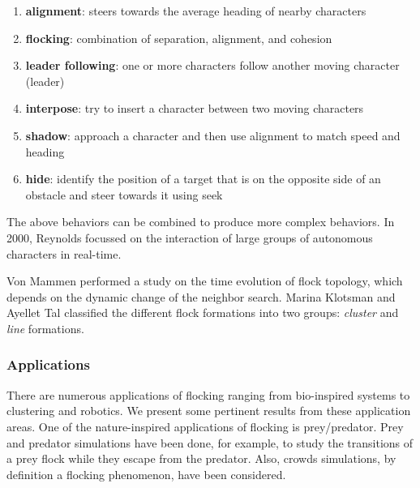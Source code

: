 \begin{enumerate}
\item \textbf{alignment}: steers towards the average heading of nearby characters
\item \textbf{flocking}: combination of separation, alignment, and cohesion
\item \textbf{leader following}: one or more characters follow another moving character (leader)
\item \textbf{interpose}: try to insert a character between two moving characters
\item \textbf{shadow}: approach a character and then use alignment to match speed and heading
\item \textbf{hide}: identify the position of a target that is on the opposite side of an obstacle and  steer towards it using seek
\end{enumerate} 
 
The above behaviors can be combined to produce more complex behaviors. 
In 2000, Reynolds focussed on the interaction of large groups of autonomous characters 
in real-time\cite{craigInteractionGroups}.

Von Mammen\cite{spatialSwarms} performed a study on the time evolution of flock topology, which depends on the dynamic change of the neighbor search. Marina Klotsman and Ayellet Tal\cite{lineFormations}  classified the different flock formations into two groups: \textit{cluster} and \textit{line} formations.


\subsubsection{Applications}
There are numerous applications of flocking ranging from bio-inspired systems to clustering and robotics. We present some pertinent results from these application areas. One of the nature-inspired applications of flocking is prey/predator\cite{gems2}. Prey and predator simulations have been done, for example, to study the transitions of a prey flock while they escape from the predator\cite{preyFlock}. Also, crowds simulations, by definition a flocking phenomenon, have been considered\cite{crowdsPS3}. 


